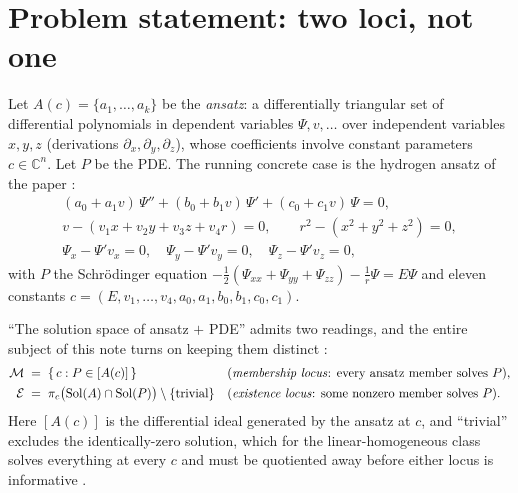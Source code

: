 \documentclass[11pt]{article}
\newcommand{\Psib}{\Psi}
\newcommand{\Mem}{\mathcal{M}}
\newcommand{\Ex}{\mathcal{E}}
\DeclareMathOperator{\Sol}{Sol}
\begin{document}
\tableofcontents

\section{Problem statement: two loci, not one}
\label{sec:problem}

Let $A(c) = \{a_1,\dots,a_k\}$ be the \emph{ansatz}: a differentially
triangular set of differential polynomials in dependent variables
$\Psib, v, \dots$ over independent variables $x,y,z$ (derivations
$\partial_x,\partial_y,\partial_z$), whose coefficients involve constant
parameters $c \in \mathbb{C}^n$. Let $P$ be the PDE. The running concrete case
is the hydrogen ansatz of the paper \cite{NewMethod}:
\begin{equation}
\label{eq:hydrogen-ansatz}
\begin{gathered}
(a_0+a_1v)\,\Psib'' + (b_0+b_1v)\,\Psib' + (c_0+c_1v)\,\Psib = 0,\\
v - (v_1x+v_2y+v_3z+v_4r) = 0, \qquad r^2 - (x^2+y^2+z^2) = 0,\\
\Psib_x - \Psib'v_x = 0,\quad \Psib_y - \Psib'v_y = 0,\quad \Psib_z - \Psib'v_z = 0,
\end{gathered}
\end{equation}
with $P$ the Schr\"odinger equation
$-\tfrac12(\Psib_{xx}+\Psib_{yy}+\Psib_{zz}) - \tfrac1r\Psib = E\Psib$ and
eleven constants $c = (E, v_1,\dots,v_4, a_0,a_1,b_0,b_1,c_0,c_1)$.

``The solution space of ansatz $+$ PDE'' admits two readings, and the entire
subject of this note turns on keeping them distinct
\cite{membership-note}:
\begin{align}
\Mem &\;=\; \{\, c : P \in [A(c)] \,\}
  && \text{(\emph{membership locus}: every ansatz member solves $P$),}
  \label{eq:M}\\
\Ex &\;=\; \pi_c\bigl(\Sol(A)\cap\Sol(P)\bigr)\setminus\{\text{trivial}\}
  && \text{(\emph{existence locus}: some nonzero member solves $P$).}
  \label{eq:E}
\end{align}
Here $[A(c)]$ is the differential ideal generated by the ansatz at $c$, and
``trivial'' excludes the identically-zero solution, which for the
linear-homogeneous class solves everything at every $c$ and must be quotiented
away before either locus is informative
\cite[\S2bis, ``Two saturations'']{bounded-prolongation-note}.
\end{document}
